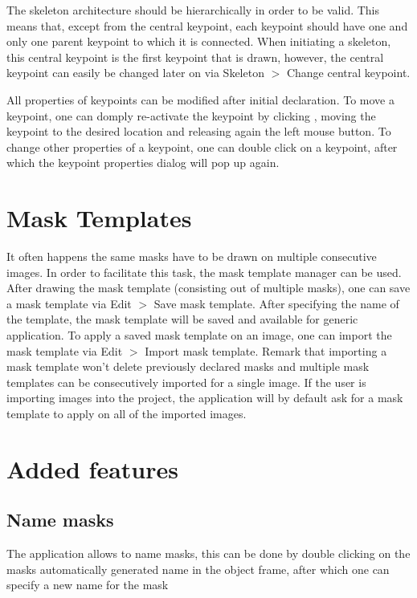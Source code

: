 \documentclass[a4paper, 11pt]{article}
\begin{document}
The skeleton architecture should be hierarchically in order to be valid. This means that, except from the central keypoint, each keypoint should have one and only one parent keypoint to which it is connected. When initiating a skeleton, this central keypoint is the first keypoint that is drawn, however, the central keypoint can easily be changed later on via Skeleton $>$ Change central keypoint.

All properties of keypoints can be modified after initial declaration. To move a keypoint, one can domply re-activate the keypoint by clicking , moving the keypoint to the desired location and releasing again the left mouse button. To change other properties of a keypoint, one can double click on a keypoint, after which the keypoint properties dialog will pop up again.

\section{Mask Templates}
It often happens the same masks have to be drawn on multiple consecutive images. In order to facilitate this task, the mask template manager can be used. After drawing the mask template (consisting out of multiple masks), one can save a mask template via Edit $>$ Save mask template. After specifying the name of the template, the mask template will be saved and available for generic application. To apply a saved mask template on an image, one can import the mask template via Edit $>$ Import mask template. Remark that importing a mask template won't delete previously declared masks and multiple mask templates can be consecutively imported for a single image. If the user is importing images into the project, the application will by default ask for a mask template to apply on all of the imported images.

\section{Added features}

\subsection{Name masks}
The application allows to name masks, this can be done by double clicking on the masks automatically generated name in the object frame, after which one can specify a new name for the mask
\end{document}
